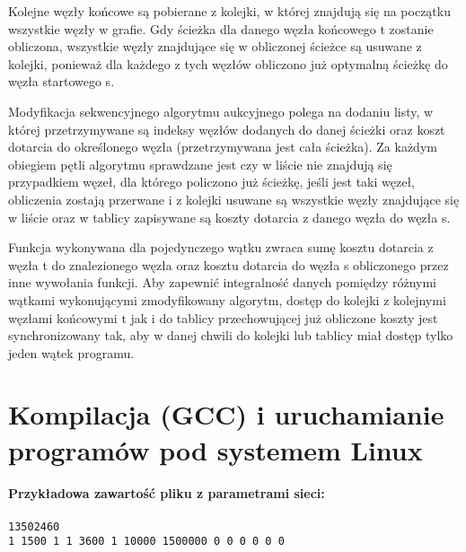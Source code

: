\documentclass[12pt,a4paper]{article}
\begin{document}
Kolejne węzły końcowe są pobierane z kolejki, w której znajdują się na początku wszystkie węzły w grafie. Gdy ścieżka dla danego węzła końcowego t zostanie obliczona, wszystkie węzły znajdujące się w obliczonej ścieżce są usuwane z kolejki, ponieważ dla każdego z tych węzłów  obliczono już optymalną ścieżkę do węzła startowego s.

Modyfikacja sekwencyjnego algorytmu aukcyjnego polega na dodaniu listy, w której przetrzymywane są indeksy węzłów dodanych do danej ścieżki oraz koszt dotarcia do określonego węzła (przetrzymywana jest cała ścieżka). Za każdym obiegiem pętli algorytmu sprawdzane jest czy w liście nie znajdują się przypadkiem węzeł, dla którego policzono już ścieżkę, jeśli jest taki węzeł, obliczenia zostają przerwane i z kolejki usuwane są wszystkie węzły znajdujące się w liście oraz w tablicy zapisywane są koszty dotarcia z danego węzła do węzła s.

Funkcja wykonywana dla pojedynczego wątku zwraca sumę kosztu dotarcia z węzła t do znalezionego węzła oraz kosztu dotarcia do węzła s obliczonego przez inne wywołania funkcji. Aby zapewnić integralność danych pomiędzy różnymi wątkami wykonującymi zmodyfikowany algorytm, dostęp do kolejki z kolejnymi węzłami końcowymi t jak i do tablicy przechowującej już obliczone koszty jest synchronizowany tak, aby w danej chwili do kolejki lub tablicy miał dostęp tylko jeden wątek programu.
\section{Kompilacja (GCC) i uruchamianie programów pod systemem Linux}
\textbf{Przykładowa zawartość pliku z parametrami sieci:}\\\\
\texttt{13502460\\
1 1500 1 1 3600 1 10000 1500000 0 0 0 0 0 0}\\
\end{document}
